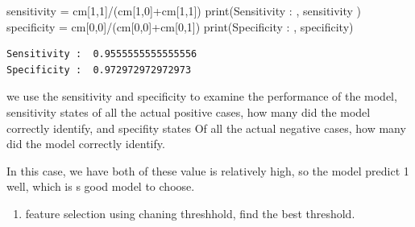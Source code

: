 \documentclass[
  11pt,
  letterpaper,
  DIV=11,
  numbers=noendperiod]{scrartcl}
\newenvironment{Shaded}{\begin{snugshade}}{\end{snugshade}}
\newcommand{\BuiltInTok}[1]{\textcolor[rgb]{0.00,0.23,0.31}{#1}}
\newcommand{\DecValTok}[1]{\textcolor[rgb]{0.68,0.00,0.00}{#1}}
\newcommand{\NormalTok}[1]{\textcolor[rgb]{0.00,0.23,0.31}{#1}}
\newcommand{\OperatorTok}[1]{\textcolor[rgb]{0.37,0.37,0.37}{#1}}
\newcommand{\StringTok}[1]{\textcolor[rgb]{0.13,0.47,0.30}{#1}}
\providecommand{\tightlist}{%
  \setlength{\itemsep}{0pt}\setlength{\parskip}{0pt}}\usepackage{longtable,booktabs,array}
\begin{document}
\begin{Shaded}
\begin{Highlighting}[]
\NormalTok{sensitivity }\OperatorTok{=}\NormalTok{ cm[}\DecValTok{1}\NormalTok{,}\DecValTok{1}\NormalTok{]}\OperatorTok{/}\NormalTok{(cm[}\DecValTok{1}\NormalTok{,}\DecValTok{0}\NormalTok{]}\OperatorTok{+}\NormalTok{cm[}\DecValTok{1}\NormalTok{,}\DecValTok{1}\NormalTok{])}
\BuiltInTok{print}\NormalTok{(}\StringTok{\textquotesingle{}Sensitivity : \textquotesingle{}}\NormalTok{, sensitivity )}
\NormalTok{specificity }\OperatorTok{=}\NormalTok{ cm[}\DecValTok{0}\NormalTok{,}\DecValTok{0}\NormalTok{]}\OperatorTok{/}\NormalTok{(cm[}\DecValTok{0}\NormalTok{,}\DecValTok{0}\NormalTok{]}\OperatorTok{+}\NormalTok{cm[}\DecValTok{0}\NormalTok{,}\DecValTok{1}\NormalTok{])}
\BuiltInTok{print}\NormalTok{(}\StringTok{\textquotesingle{}Specificity : \textquotesingle{}}\NormalTok{, specificity)}
\end{Highlighting}
\end{Shaded}

\begin{verbatim}
Sensitivity :  0.9555555555555556
Specificity :  0.972972972972973
\end{verbatim}

we use the sensitivity and specificity to examine the performance of the
model, sensitivity states of all the actual positive cases, how many did
the model correctly identify, and specifity states Of all the actual
negative cases, how many did the model correctly identify.

In this case, we have both of these value is relatively high, so the
model predict 1 well, which is s good model to choose.

\begin{enumerate}
\def\labelenumi{\arabic{enumi}.}
\setcounter{enumi}{10}
\tightlist
\item
  feature selection using chaning threshhold, find the best threshold.
\end{enumerate}
\end{document}
